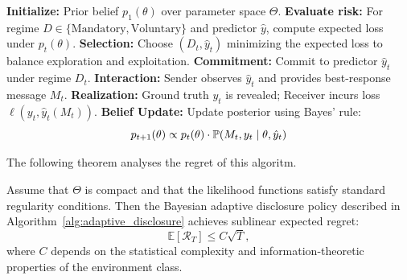 \begin{algorithm}[!ht]
\caption{Bayesian Adaptive Disclosure Protocol}
\label{alg:adaptive_disclosure}
\begin{algorithmic}[1]
\State \textbf{Initialize:} Prior belief $p_1(\theta)$ over parameter space $\Theta$.
    \State \textbf{Evaluate risk:} For regime $D \in \{\text{Mandatory}, \text{Voluntary}\}$ and predictor $\hat{y}$, compute expected loss under $p_t(\theta)$.
    \State \textbf{Selection:} Choose $(D_t, \hat{y}_t)$ minimizing the expected loss to balance exploration and exploitation.
    \State \textbf{Commitment:} Commit to predictor $\hat{y}_t$ under regime $D_t$.
    \State \textbf{Interaction:} Sender observes $\hat{y}_t$ and provides best-response message $M_t$.
    \State \textbf{Realization:} Ground truth $y_t$ is revealed; Receiver incurs loss $\ell(y_t, \hat{y}_t(M_t))$.
    \State \textbf{Belief Update:} Update posterior using Bayes' rule:
    \[ p_{t+1}(\theta) \propto p_t(\theta) \cdot \mathbb{P}(M_t, y_t \mid \theta, \hat{y}_t) \]
\EndFor
\end{algorithmic}
\end{algorithm}

The following theorem analyses the regret of this algoritm.
\begin{theorem} \label{thm:online_regret}
Assume that $\Theta$ is compact and that the likelihood functions satisfy standard regularity conditions. Then the Bayesian adaptive disclosure policy described in Algorithm~\ref{alg:adaptive_disclosure} achieves sublinear expected regret:
\begin{equation}
    \mathbb{E}[\mathcal{R}_T] \le C \sqrt{T},
\end{equation}
where $C$ depends on the statistical complexity and information-theoretic properties of the environment class.
\end{theorem}
